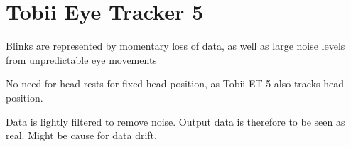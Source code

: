 \section{Tobii Eye Tracker 5} \label{sec:hwds_TobiiEyeTracker5}

Blinks are represented by momentary loss of data, as well as large noise levels from unpredictable eye movements

No need for head rests for fixed head position, as Tobii ET 5 also tracks head position.

Data is lightly filtered to remove noise. Output data is therefore to be seen as real. Might be cause for data drift.